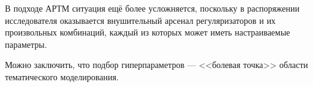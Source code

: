 В подходе АРТМ ситуация ещё более усложняется, поскольку в распоряжении исследователя оказывается внушительный арсенал регуляризаторов и их произвольных комбинаций, каждый из которых может иметь настраиваемые параметры.

Можно заключить, что подбор гиперпараметров --- <<болевая точка>> области тематического моделирования.


